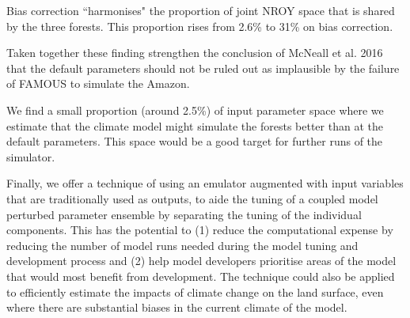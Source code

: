 \documentclass[gmd, manuscript]{copernicus}
\begin{document}
Bias correction ``harmonises" the proportion of joint NROY space that is shared by the three forests. This proportion rises from 2.6\% to 31\% on bias correction.

Taken together these finding strengthen the conclusion of McNeall et al. 2016 that the default parameters should not be ruled out as implausible by the failure of FAMOUS to simulate the Amazon.

We find a small proportion (around 2.5\%) of input parameter space where we estimate that the climate model might simulate the forests better than at the default parameters. This space would be a good target for further runs of the simulator.

Finally, we offer a technique of using an emulator augmented with input variables that are traditionally used as outputs, to aide the tuning of a coupled model perturbed parameter ensemble by separating the tuning of the individual components. This has the potential to (1) reduce the computational expense by reducing the number of model runs needed during the model tuning and development process and (2) help model developers prioritise areas of the model that would most benefit from development. The technique could also be applied to efficiently estimate the impacts of climate change on the land surface, even where there are substantial biases in the current climate of the model.













\end{document}
